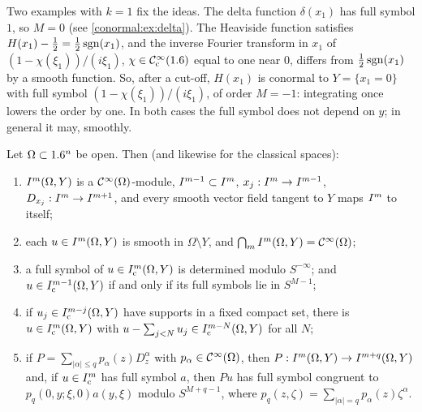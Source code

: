 \begin{discussion}
  Two examples with $k=1$ fix the ideas. The delta function $\delta(x_1)$ has
  full symbol $1$, so $M=0$ (see \cref{conormal:ex:delta}). The Heaviside
  function satisfies $H(x_1)-\frac12=\frac12\operatorname{sgn}(x_1)$, and the inverse
  Fourier transform in $x_1$ of $(1-\chi(\xi_1))/(i\xi_1)$, $\chi\in\mathcal{C}^\infty_{\mathrm{c}}(1.6)$
  equal to one near $0$, differs from $\frac12\operatorname{sgn}(x_1)$ by a smooth function.
  So, after a cut-off, $H(x_1)$ is conormal to $Y=\{x_1=0\}$ with full
  symbol $(1-\chi(\xi_1))/(i\xi_1)$, of order $M=-1$: integrating once lowers
  the order by one. In both cases the full symbol does not depend on $y$; in
  general it may, smoothly.
\end{discussion}

\begin{proposition}\label{conormal:prop:local-basic}
  Let $\Omega\subset1.6^n$ be open.  Then (and likewise for the classical spaces):
  \begin{enumerate}[label=(\roman*)]
  \item $I^{m}(\Omega,Y)$ is a $\mathcal{C}^\infty(\Omega)$-module, $I^{m-1}\subset I^{m}$,
    $x_j:I^{m}\to I^{m-1}$, $D_{x_j}:I^{m}\to I^{m+1}$, and every smooth vector
    field tangent to $Y$ maps $I^{m}$ to itself;
  \item each $u\in I^{m}(\Omega,Y)$ is smooth in $\Omega\setminus Y$, and
    $\bigcap_mI^{m}(\Omega,Y)=\mathcal{C}^\infty(\Omega)$;
  \item a full symbol of $u\in I^{m}_{\mathrm c}(\Omega,Y)$ is determined modulo
    $S^{-\infty}$; and $u\in I^{m-1}_{\mathrm c}(\Omega,Y)$ if and only if its
    full symbols lie in $S^{M-1}$;
  \item if $u_j\in I^{m-j}_{\mathrm c}(\Omega,Y)$ have supports in a fixed
    compact set, there is $u\in I^{m}_{\mathrm c}(\Omega,Y)$ with
    $u-\sum_{j<N}u_j\in I^{m-N}_{\mathrm c}(\Omega,Y)$ for all $N$;
  \item if $P=\sum_{|\alpha|\le q}p_\alpha(z)D_z^\alpha$ with
    $p_\alpha\in\mathcal{C}^\infty(\Omega)$, then $P:I^{m}(\Omega,Y)\to I^{m+q}(\Omega,Y)$ and,
    if $u\in I^{m}_{\mathrm c}$ has full symbol $a$, then $Pu$ has full symbol
    congruent to $p_q(0,y;\xi,0)a(y,\xi)$ modulo $S^{M+q-1}$, where
    $p_q(z,\zeta)=\sum_{|\alpha|=q}p_\alpha(z)\zeta^\alpha$.
  \end{enumerate}
\end{proposition}
